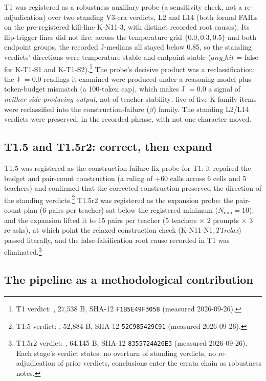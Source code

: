 \documentclass[11pt]{article}
\newcommand{\sha}[1]{\texttt{#1}}
\begin{document}
T1 was registered as a robustness auxiliary probe (a sensitivity check, not a re-adjudication) over two standing V3-era verdicts, L2 and L14 (both formal FAILs on the pre-registered kill-line K-N11-3, with distinct recorded root causes). Its flip-trigger lines did not fire: across the temperature grid $\{0.0, 0.3, 0.5\}$ and both endpoint groups, the recorded J-medians all stayed below 0.85, so the standing verdicts' directions were temperature-stable and endpoint-stable ($any\_hit$ = false for K-T1-S1 and K-T1-S2).\footnote{T1 verdict: , 27{,}538 B, SHA-12 \sha{F1B5E49F3058} (measured 2026-09-26).} The probe's decisive product was a reclassification: the J $= 0.0$ readings it examined were produced under a reasoning-model plus token-budget mismatch (a 100-token cap), which makes J $= 0.0$ a signal of \emph{neither side producing output}, not of teacher stability; five of five K-family items were reclassified into the construction-failure ($\beta$) family. The standing L2/L14 verdicts were preserved, in the recorded phrase, with not one character moved.

\subsection{T1.5 and T1.5r2: correct, then expand}

T1.5 was registered as the construction-failure-fix probe for T1: it repaired the budget and pair-count construction (a ruling of +60 calls across 6 cells and 5 teachers) and confirmed that the corrected construction preserved the direction of the standing verdicts.\footnote{T1.5 verdict: , 52{,}884 B, SHA-12 \sha{52C985429C91} (measured 2026-09-26).} T1.5r2 was registered as the expansion probe: the pair-count plan (6 pairs per teacher) sat below the registered minimum ($N_{\min} = 10$), and the expansion lifted it to 15 pairs per teacher (5 teachers $\times$ 2 prompts $\times$ 3 re-asks), at which point the relaxed construction check (K-N11-N1\emph{,T1relax}) passed literally, and the false-falsification root cause recorded in T1 was eliminated.\footnote{T1.5r2 verdict: , 64{,}145 B, SHA-12 \sha{8355724A26E3} (measured 2026-09-26). Each stage's verdict states: no overturn of standing verdicts, no re-adjudication of prior verdicts, conclusions enter the errata chain as robustness notes.}

\subsection{The pipeline as a methodological contribution}
\end{document}
